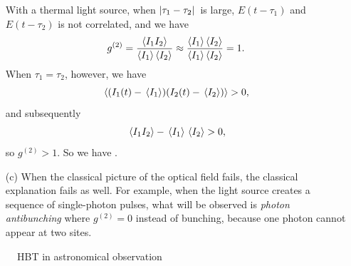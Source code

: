 \documentclass[hyperref, a4paper]{article}
\begin{document}
\begin{itemize}
    With a thermal light source, when $\abs*{\tau_1 - \tau_2}$ is large, $E(t - \tau_1)$ and $E(t - \tau_2)$ is not correlated, and we have 
    \[
        g^{(2)} = \frac{\expval{I_1 I_2}}{\expval{I_1} \expval{I_2}} \approx \frac{\expval{I_1} \expval{I_2}}{\expval{I_1} \expval{I_2}} = 1.
    \]
    When $\tau_1 = \tau_2$, however, we have 
    \[
        \expval{(I_1(t) - \expval*{I_1}) (I_2(t) - \expval*{I_2})} > 0,
    \]
    and subsequently
    \[
        \expval*{I_1 I_2} - \expval*{I_1} \expval*{I_2} > 0, 
    \]
    so $g^{(2)} > 1$.
    So we have .
    \item[(c)] When the classical picture of the optical field fails, the classical explanation fails as well.
    For example, when the light source creates a sequence of single-photon pulses, what will be observed is \emph{photon antibunching} where $g^{(2)} = 0$ instead of bunching, because one photon cannot appear at two sites.
\end{itemize}

\begin{figure}
    \centering
    
    \caption{HBT in astronomical observation}
    \label{fig:hbt-astronomy}
\end{figure}

\paragraph{}
\end{document}
